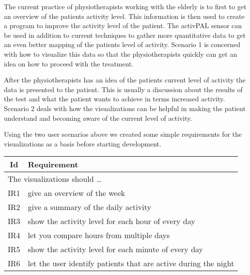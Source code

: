 The current practice of physiotherapists working with the elderly is to first to get an overview of the patients activity level. This information is then used to create a program to improve the activity level of the patient. The activPAL sensor can be used in addition to current techniques to gather more quantitative data to get an even better mapping of the patients level of activity. Scenario 1 is concerned with how to visualize this data so that the physiotherapists quickly can get an idea on how to proceed with the treatment.

After the physiotherapists has an idea of the patients current level of activity the data is presented to the patient. This is usually a discussion about the results of the test and what the patient wants to achieve in terms increased activity. Scenario 2 deals with how the visualizations can be helpful in making the patient understand and becoming aware of the current level of activity.

Using the two user scenarios above we created some simple requirements for the visualizations as a basis before starting development.

\begin{table}[h!]
  \begin{center}
  \begin{tabular}{|c|p{12cm}|}
    \hline
      \textbf{Id} & \textbf{Requirement} \\ \hline
    \multicolumn{2}{|l|}{The visualizations should \ldots} \\ \hline
      IR1 & give an overview of the week \\ \hline
      IR2 & give a summary of the daily activity \\ \hline
      IR3 & show the activity level for each hour of every day \\ \hline
      IR4 & let you compare hours from multiple days \\ \hline
      IR5 & show the activity level for each minute of every day \\ \hline
      IR6 & let the user identify patients that are active during the night \\ \hline
  \end{tabular}
  \end{center}
\end{table}
